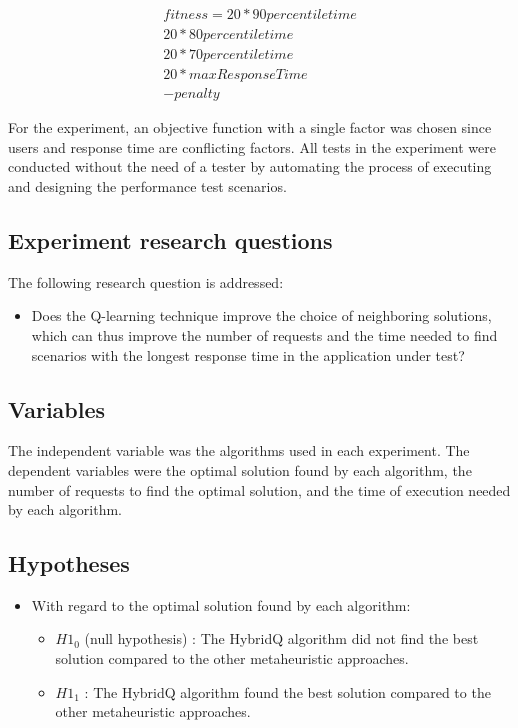 \documentclass{bmcart}
\begin{document}
\begin{equation}
\begin{aligned}
fitness=
20* 90percentiletime\\
20*80percentiletime\\
20*70percentiletime\\
20*maxResponseTime\\
-penalty
\end{aligned}
\end{equation}

For the experiment, an objective function with a single factor was chosen since users and response time are conflicting factors. All tests in the experiment were conducted without the need of a tester by automating the process of executing and designing the performance test scenarios.    

\subsection{Experiment research questions}

The following research question is addressed:

\begin{itemize}
\item Does the Q-learning technique improve the choice of neighboring solutions, which can thus improve the number of requests and the time needed to find scenarios with the longest response time in the application under test?
\end{itemize}

\subsection{Variables}

The independent variable was the algorithms used in each experiment. The dependent variables were the optimal solution found by each algorithm, the number of requests to find the optimal solution, and the time of execution needed by each algorithm.

\subsection{Hypotheses}

\begin{itemize}
\item With regard to the optimal solution found by each algorithm:
\begin{itemize}
\item $H1_{0}$ (null hypothesis) : The HybridQ algorithm did not find the best solution compared to the other metaheuristic approaches.
\item $H1_{1}$  : The HybridQ algorithm found the best solution compared to the other metaheuristic approaches.
\end{itemize}
\end{itemize}
\end{document}
